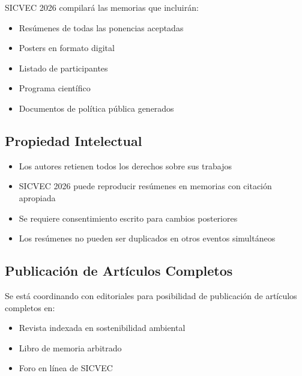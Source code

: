 \documentclass[12pt,a4paper]{article}
\begin{document}
SICVEC 2026 compilará las memorias que incluirán:

\begin{itemize}[label={\textcolor{verdeosc}{\textbullet}}]
  \item Resúmenes de todas las ponencias aceptadas
  \item Posters en formato digital
  \item Listado de participantes
  \item Programa científico
  \item Documentos de política pública generados
\end{itemize}

\subsection{Propiedad Intelectual}

\begin{tcolorbox}[cajainfo, title=Derechos y responsabilidades]
\begin{itemize}[label={\textcolor{verdemid}{\textbullet}}]
  \item Los autores retienen todos los derechos sobre sus trabajos
  \item SICVEC 2026 puede reproducir resúmenes en memorias con citación apropiada
  \item Se requiere consentimiento escrito para cambios posteriores
  \item Los resúmenes no pueden ser duplicados en otros eventos simultáneos
\end{itemize}
\end{tcolorbox}

\subsection{Publicación de Artículos Completos}

Se está coordinando con editoriales para posibilidad de publicación de artículos completos en:

\begin{itemize}[label={\textcolor{verdemid}{\checkmark}}]
  \item Revista indexada en sostenibilidad ambiental
  \item Libro de memoria arbitrado
  \item Foro en línea de SICVEC
\end{itemize}

\end{document}
